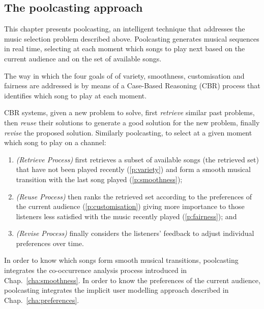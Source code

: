 
\subsection{The poolcasting approach} %
\label{sub:what_is_poolcasting}

This chapter presents poolcasting, an intelligent technique that addresses the music selection problem described above.
Poolcasting generates musical sequences in real time, selecting at each moment which songs to play next based on the current audience and on the set of available songs.



The way in which the four goals of of variety, smoothness, customisation and fairness are addressed is by means of a Case-Based Reasoning (CBR) process that identifies which song to play at each moment.

CBR systems, given a new problem to solve, first \emph{retrieve} similar past problems, then \emph{reuse} their solutions to generate a good solution for the new problem, finally \emph{revise} the proposed solution.
Similarly poolcasting, to select at a given moment which song to play on a channel:
\begin{enumerate}
 \item \emph{(Retrieve Process)} first retrieves a subset of available songs (the retrieved set) that have not been played recently (\ref{p:variety}) and form a smooth musical transition with the last song played (\ref{p:smoothness});
 \item \emph{(Reuse Process)} then ranks the retrieved set according to the preferences of the current audience (\ref{p:customisation}) giving more importance to those listeners less satisfied with the music recently played (\ref{p:fairness}); and  
 \item \emph{(Revise Process)} finally considers the listeners' feedback to adjust individual preferences %
over time.
\end{enumerate}

In order to know which songs form smooth musical transitions, poolcasting integrates the co-occurrence analysis process introduced in Chap.~\ref{cha:smoothness}. In order to know the preferences of the current audience, poolcasting integrates the implicit user modelling approach described in Chap.~\ref{cha:preferences}. 


